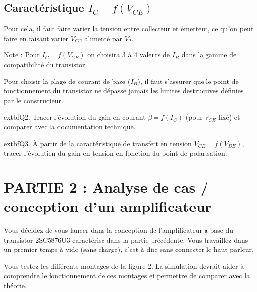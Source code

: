\documentclass[a4paper]{article}
\begin{document}
\subsection*{Caractéristique $I_C=f(V_{CE})$}
Pour cela, il faut faire varier la tension entre collecteur et émetteur, ce qu’on peut faire en faisant varier $V_{CC}$ alimenté par $V_2$.

Note : Pour $I_C=f(V_{CE})$ on choisira 3 à 4 valeurs de $I_B$ dans la gamme de compatibilité du transistor.

Pour choisir la plage de courant de base ($I_B$), il faut s’assurer que le point de fonctionnement du transistor ne dépasse jamais les limites destructives définies par le constructeur.

	extbf{Q2.} Tracer l’évolution du gain en courant $\beta = f(I_C)$ (pour $V_{CE}$ fixé) et comparer avec la documentation technique.

	extbf{Q3.} À partir de la caractéristique de transfert en tension $V_{CE}= f(V_{BE})$, tracer l’évolution du gain en tension en fonction du point de polarisation.

\section*{PARTIE 2 : Analyse de cas / conception d’un amplificateur}
Vous décidez de vous lancer dans la conception de l’amplificateur à base du transistor 2SC5876U3 caractérisé dans la partie précédente. Vous travaillez dans un premier temps à vide (sans charge), c'est-à-dire sans connecter le haut-parleur.

Vous testez les différents montages de la figure 2. La simulation devrait aider à comprendre le fonctionnement de ces montages et permettre de comparer avec la théorie.


\end{document}
